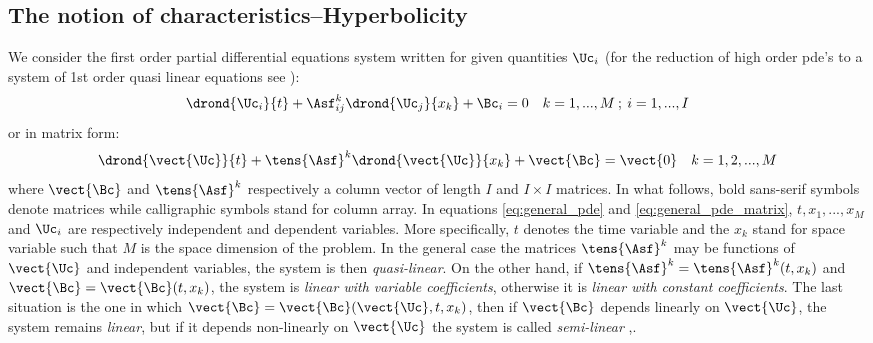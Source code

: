 \subsection{The notion of characteristics--Hyperbolicity}
\cite[p.55]{Courant}
We consider the first order partial differential equations system written for given quantities $\Uc_i$ (for the reduction of high order pde's to a system of 1st order quasi linear equations see \cite[Chapter~1 -- Section~7 -- p.40]{Courant}):
\begin{equation}
  \label{eq:general_pde}
  \drond{\Uc_i}{t} + \Asf^k_{ij}\drond{\Uc_j}{x_k} + \Bc_i= 0 \quad k=1,...,M \:;\: i=1,...,I
\end{equation}
or in matrix form:
\begin{equation}
  \label{eq:general_pde_matrix}
  \drond{\vect{\Uc}}{t} + \tens{\Asf}^k \drond{\vect{\Uc}}{x_k} + \vect{\Bc} = \vect{0}\quad k=1,2,...,M
\end{equation}
where $\vect{\Bc}$ and $\tens{\Asf}^k$ respectively a column vector of length $I$ and $I\times I$ matrices. In what follows, bold sans-serif symbols denote matrices while calligraphic symbols stand for column array. In equations \ref{eq:general_pde} and \ref{eq:general_pde_matrix}, $t,x_1,...,x_M$ and $\Uc_i$ are respectively independent and dependent variables. More specifically, $t$ denotes the time variable and the $x_k$ stand for space variable such that $M$ is the space dimension of the problem. In the general case the matrices $\tens{\Asf}^k$ may be functions of $\vect{\Uc}$ and independent variables, the system is then \textit{quasi-linear}. On the other hand, if $\tens{\Asf}^k=\tens{\Asf}^k(t,x_k)$ and $\vect{\Bc}=\vect{\Bc}(t,x_k)$, the system is \textit{linear with variable coefficients}, otherwise it is \textit{linear with constant coefficients}. The last situation is the one in which $\vect{\Bc}=\vect{\Bc}(\vect{\Uc},t,x_k)$, then if $\vect{\Bc}$ depends linearly on $\vect{\Uc}$, the system remains \textit{linear}, but if it depends non-linearly on $\vect{\Uc}$ the system is called \textit{semi-linear} \cite[Chapter~5]{Courant},\cite[Chapter~2]{Toro}.

